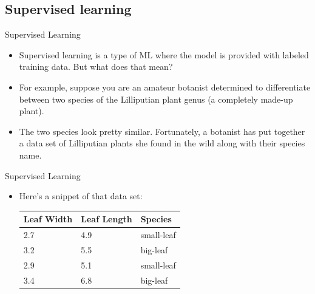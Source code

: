\documentclass{beamer}
\begin{document}

\subsection{Supervised learning}

\begin{frame}{Supervised Learning}

\begin{itemize}
\item Supervised learning is a type of ML where the model is provided with labeled training data. But what does that mean?

\item For example, suppose you are an amateur botanist determined to differentiate between two species of the Lilliputian plant genus (a completely made-up plant). 

\item The two species look pretty similar. Fortunately, a botanist has put together a data set of Lilliputian plants she found in the wild along with their species name.
\end{itemize}

\end{frame}


\begin{frame}{Supervised Learning}

\begin{itemize}
\item Here's a snippet of that data set:

\bigskip
\begin{tabular}{lll}
Leaf Width & Leaf Length & Species \\ \hline
2.7	& 4.9 & small-leaf \\
3.2	& 5.5 & big-leaf \\
2.9	& 5.1 & small-leaf \\
3.4	& 6.8 & big-leaf 
\end{tabular}

\end{itemize}

\end{frame}

\end{document}
